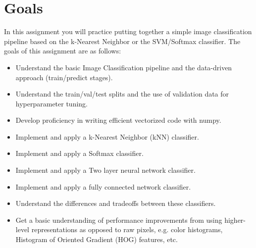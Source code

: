 \section{Goals}

In this assignment you will practice putting together a simple image classification pipeline based on the k-Nearest Neighbor or the SVM/Softmax classifier. 
The goals of this assignment are as follows:

\begin{itemize}
    \item Understand the basic Image Classification pipeline and the data-driven approach (train/predict stages).
    \item Understand the train/val/test splits and the use of validation data for hyperparameter tuning.
    \item Develop proficiency in writing efficient vectorized code with numpy.
    \item Implement and apply a k-Nearest Neighbor (kNN) classifier.
    \item Implement and apply a Softmax classifier.
    \item Implement and apply a Two layer neural network classifier.
    \item Implement and apply a fully connected network classifier.
    \item Understand the differences and tradeoffs between these classifiers.
    \item Get a basic understanding of performance improvements from using higher-level representations as opposed to raw pixels, e.g. color histograms, Histogram of Oriented Gradient (HOG) features, etc.
\end{itemize}

\newpage